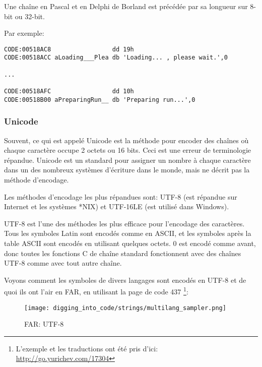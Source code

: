 Une chaîne en Pascal et en Delphi de Borland est précédée par sa longueur sur 8-bit
ou 32-bit.

Par exemple:

\begin{lstlisting}[caption=Delphi,style=customasmx86]
CODE:00518AC8                 dd 19h
CODE:00518ACC aLoading___Plea db 'Loading... , please wait.',0

...

CODE:00518AFC                 dd 10h
CODE:00518B00 aPreparingRun__ db 'Preparing run...',0
\end{lstlisting}

\subsubsection{Unicode}


Souvent, ce qui est appelé Unicode est la méthode pour encoder des chaînes où chaque
caractère occupe 2 octets ou 16 bits.
Ceci est une erreur de terminologie répandue.
Unicode est un standard pour assigner un nombre à chaque caractère dans un des nombreux
systèmes d'écriture dans le monde, mais ne décrit pas la méthode d'encodage.

Les méthodes d'encodage les plus répandues sont: UTF-8 (est répandue sur Internet
et les systèmes *NIX) et UTF-16LE (est utilisé dans Windows).


UTF-8 est l'une des méthodes les plus efficace pour l'encodage des caractères.
Tous les symboles Latin sont encodés comme en ASCII, et les symboles après la table
ASCII sont encodés en utilisant quelques octets.
0 est encodé comme avant, donc toutes les fonctions C de chaîne standard fonctionnent
avec des chaînes UTF-8 comme avec tout autre chaîne.

Voyons comment les symboles de divers langages sont encodés en UTF-8 et de quoi ils
ont l'air en FAR, en utilisant la page de code 437%
\footnote{L'exemple et les traductions ont été pris d'ici:
\url{http://go.yurichev.com/17304}}:

\begin{figure}[H]
\centering
\texttt{[image: digging\_into\_code/strings/multilang\_sampler.png]}
\end{figure}

\begin{figure}[H]
\centering
{}
\caption{FAR: UTF-8}
\end{figure}

